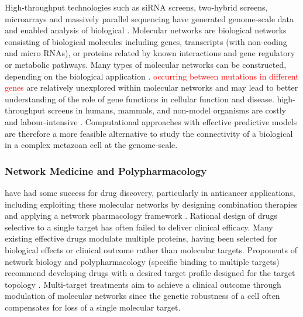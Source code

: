 High-throughput technologies such as \gls{siRNA} screens, two-hybrid screens, \glspl{microarray} and massively parallel sequencing have generated \gls{genome}-scale data and enabled analysis of biological  \citep{Barabasi2004, Boone2007, Goodwin2016}. 
Molecular networks are biological networks consisting of biological molecules including genes, transcripts (with non-coding and micro RNAs), or proteins related by known interactions and gene regulatory or metabolic \glspl{pathway}. 
Many types of molecular networks can be constructed, depending on the biological application \citep{Barabasi2004}.  \textcolor{red}{occurring between mutations in different genes} are relatively unexplored within molecular networks and may lead to better understanding of the role of gene functions in cellular function and disease. %
\Glspl{high-throughput screen} in humans, mammals, and non-model organisms are costly and labour-intensive \citep{Fece2015}. Computational approaches with effective predictive models are therefore a more feasible alternative to study the connectivity of a biological  in a complex metazoan cell at the \gls{genome}-scale.

\iffalse
\subsubsection{Network Medicine and Polypharmacology}
 have had some success for drug discovery, particularly in anticancer applications, including exploiting these molecular networks by designing combination therapies and applying a network pharmacology framework \citep{Hopkins2008}. Rational design of drugs selective to a single target has often failed to deliver clinical efficacy. Many existing effective drugs modulate multiple proteins, having been selected for biological effects or clinical outcome rather than molecular targets. Proponents of network biology and \gls{polypharmacology} (specific binding to multiple targets) recommend developing drugs with a desired target profile designed for the target topology \citep{Hopkins2008, Barabasi2004}. Multi-target \glspl{treatment} aim to achieve a clinical outcome through modulation of molecular networks since the \gls{genetic robustness} of a cell often compensates for loss of a single molecular target.  


